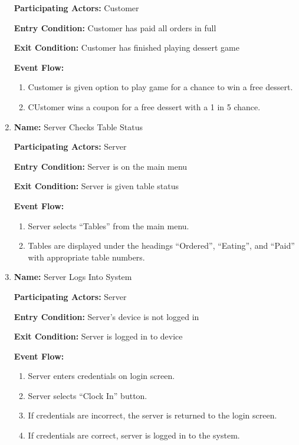 \documentclass[11pt]{article}
\begin{document}
\begin{enumerate}
			\textbf{Participating Actors:} 	Customer

			\textbf{Entry Condition:} 		Customer has paid all orders in full

			\textbf{Exit Condition:} 		Customer has finished playing dessert game

			\textbf{Event Flow:}
			\begin{enumerate}
				\setlength{\leftskip}{1cm}
				\item Customer is given option to play game for a chance to win a free dessert.
				\item CUstomer wins a coupon for a free dessert with a 1 in 5 chance.\\
			\end{enumerate}

		\item \textbf{Name:} 				Server Checks Table Status

			\textbf{Participating Actors:} 	Server

			\textbf{Entry Condition:} 		Server is on the main menu

			\textbf{Exit Condition:} 		Server is given table status

			\textbf{Event Flow:}
			\begin{enumerate}
				\setlength{\leftskip}{1cm}
				\item Server selects “Tables” from the main menu.
				\item Tables are displayed under the headings “Ordered”, “Eating”, and “Paid” with appropriate table numbers.\\
			\end{enumerate}

		\item \textbf{Name:} 				Server Logs Into System

			\textbf{Participating Actors:} 	Server

			\textbf{Entry Condition:} 		Server's device is not logged in

			\textbf{Exit Condition:} 		Server is logged in to device

			\textbf{Event Flow:}
			\begin{enumerate}
				\setlength{\leftskip}{1cm}
				\item Server enters credentials on login screen.
				\item Server selects ``Clock In'' button.
				\item If credentials are incorrect, the server is returned to the login screen.
				\item If credentials are correct, server is logged in to the system.\\
			\end{enumerate}


\end{enumerate}
\end{document}
